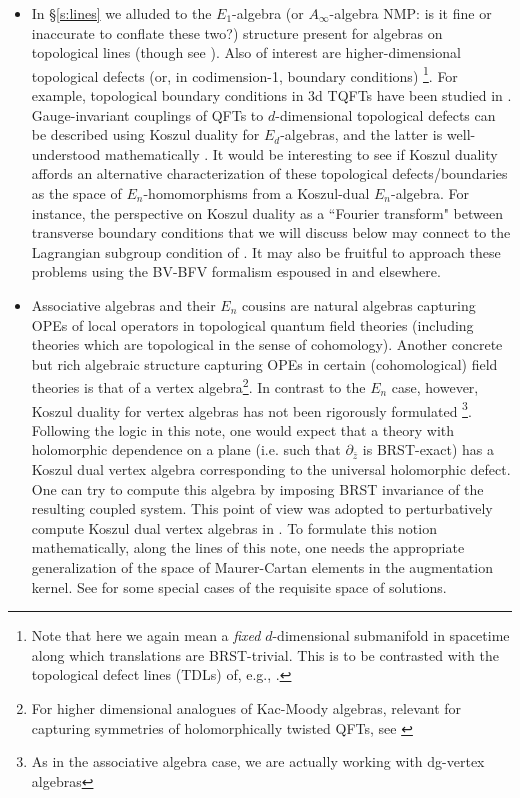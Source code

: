 \documentclass[11pt]{amsart}
\def\natalie#1{{\textcolor{green!65!black}{NMP: {#1}}}}
\begin{document}
\begin{itemize}

\item In \S \ref{s:lines} we alluded to the $E_1$-algebra (or $A_{\infty}$-algebra \natalie{is it fine or inaccurate to conflate these two?}) structure present for algebras on topological lines (though see \cite{GO}). Also of interest are higher-dimensional topological defects (or, in codimension-1, boundary conditions) \footnote{Note that here we again mean a \textit{fixed} $d$-dimensional submanifold in spacetime along which translations are BRST-trivial. This is to be contrasted with the topological defect lines (TDLs) of, e.g., \cite{Yinetal}.}. For example, topological boundary conditions in 3d TQFTs have been studied in \cite{KS, BM, Kaidietal}. Gauge-invariant couplings of QFTs to $d$-dimensional topological defects can be described using Koszul duality for $E_d$-algebras, and the latter is well-understood mathematically \cite{lurie2011formal}. It would be interesting to see if Koszul duality affords an alternative characterization of these topological defects/boundaries as the space of $E_n$-homomorphisms from a Koszul-dual $E_n$-algebra. For instance, the perspective on Koszul duality as a ``Fourier transform" between transverse boundary conditions that we will discuss below may connect to the Lagrangian subgroup condition of \cite{KS}. It may also be fruitful to approach these problems using the BV-BFV formalism espoused in \cite{Cattaneo:2020lle} and elsewhere. 

\item Associative algebras and their $E_n$ cousins are natural algebras capturing OPEs of local operators in topological quantum field theories (including theories which are topological in the sense of cohomology).  Another concrete but rich algebraic structure capturing OPEs in certain (cohomological) field theories is that of a vertex algebra\footnote{For higher dimensional analogues of Kac-Moody algebras, relevant for capturing symmetries of holomorphically twisted QFTs, see \cite{GW}}. In contrast to the $E_n$ case, however, Koszul duality for vertex algebras has not been rigorously formulated \footnote{As in the associative algebra case, we are actually working with dg-vertex algebras}. Following the logic in this note, one would expect that a theory with holomorphic dependence on a plane (i.e. such that $\partial_{\bar{z}}$ is BRST-exact) has a Koszul dual vertex algebra corresponding to the universal holomorphic defect. One can try to compute this algebra by imposing BRST invariance of the resulting coupled system. This point of view was adopted to perturbatively compute Koszul dual vertex algebras in \cite{CP}. To formulate this notion mathematically, along the lines of this note, one needs the appropriate generalization of the space of Maurer-Cartan elements in the augmentation kernel. See \cite{Li} for some special cases of the requisite space of solutions.  


\end{itemize}
\end{document}
